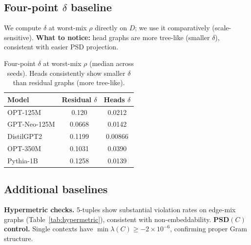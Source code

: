 \documentclass[11pt]{article}
\newcommand{\1}{\mathbf{1}}
\begin{document}
\subsection{Four-point $\delta$ baseline}
We compute $\delta$ at worst-mix $\rho$ directly on $D$; we use it comparatively (scale-sensitive). \textbf{What to notice:} head graphs are more tree-like (smaller $\delta$), consistent with easier PSD projection.

\begin{table}[t]
\centering
\caption{Four-point $\delta$ at worst-mix $\rho$ (median across seeds). Heads consistently show smaller $\delta$ than residual graphs (more tree-like).}
\label{tab:delta}
\begin{tabular}{lcc}
\toprule
Model & Residual $\delta$ & Heads $\delta$ \\
\midrule
OPT-125M & 0.120 & 0.0212 \\
GPT-Neo-125M & 0.0668 & 0.0142 \\
DistilGPT2 & 0.1199 & 0.00866 \\
OPT-350M & 0.1031 & 0.0390 \\
Pythia-1B & 0.1258 & 0.0139 \\
\bottomrule
\end{tabular}
\end{table}

\subsection{Additional baselines}
\textbf{Hypermetric checks.} 5-tuples show substantial violation rates on edge-mix graphs (Table~\ref{tab:hypermetric}), consistent with non-embeddability. \textbf{PSD$(C)$ control.} Single contexts have $\min\lambda(C) \ge -2 \times 10^{-6}$, confirming proper Gram structure.
\end{document}
